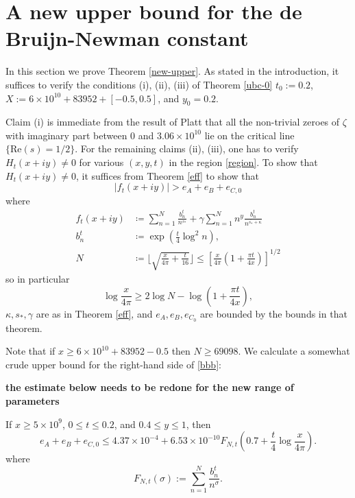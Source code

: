 \section{A new upper bound for the de Bruijn-Newman constant}

In this section we prove Theorem \ref{new-upper}.  As stated in the introduction, it suffices to verify the conditions (i), (ii), (iii) of Theorem \ref{ubc-0} $t_0 := 0.2$, $X := 6 \times 10^{10} + 83952 + [-0.5,0.5]$, and $y_0 = 0.2$.  

Claim (i) is immediate from the result of Platt \cite{platt} that all the non-trivial zeroes of $\zeta$ with imaginary part between $0$ and $3.06 \times 10^{10}$ lie on the critical line $\{ \mathrm{Re}(s) = 1/2\}$.  For the remaining claims (ii), (iii), one has to verify $H_t(x+iy) \neq 0$ for various $(x,y,t)$ in the region \eqref{region}.
To show that $H_t(x+iy) \neq 0$, it suffices from Theorem \ref{eff} to show that
\begin{equation}\label{bbb}
|f_t(x+iy)| > e_A + e_B + e_{C,0} 
\end{equation}
where
\begin{align*}
f_t(x+iy) &\coloneqq \sum_{n=1}^N \frac{b_n^t}{n^{s_*}} + \gamma \sum_{n=1}^N n^y \frac{b_n^t}{n^{\overline{s_*} + \kappa}}\\
b_n^t &\coloneqq \exp( \frac{t}{4} \log^2 n),\\
N &\coloneqq \lfloor \sqrt{\frac{x}{4\pi} + \frac{t}{16}} \rfloor \leq [\frac{x}{4\pi} (1 + \frac{\pi t}{4x})]^{1/2}
\end{align*}
so in particular
\begin{equation}\label{logx}
 \log \frac{x}{4\pi} \geq 2 \log N - \log(1 + \frac{\pi t}{4x}),
\end{equation}
$\kappa, s_*, \gamma$ are as in Theorem \ref{eff}, and $e_A, e_B, e_{C_0}$ are bounded by the bounds in that theorem.

Note that if $x \geq 6 \times 10^{10} + 83952 - 0.5$ then $N \geq 69098$.  We calculate a somewhat crude upper bound for the right-hand side of \eqref{bbb}:

{\bf the estimate below needs to be redone for the new range of parameters}

\begin{lemma}\label{lac}  If $x \geq 5 \times 10^9$, $0 \leq t \leq 0.2$, and $0.4 \leq y \leq 1$, then
$$ e_A + e_B + e_{C,0} \leq 4.37 \times 10^{-4} + 6.53 \times 10^{-10} F_{N,t}(0.7 + \frac{t}{4} \log \frac{x}{4\pi}).$$
where
\begin{equation}\label{fnt-def}
 F_{N,t}( \sigma ) := \sum_{n=1}^N \frac{b_n^t}{n^\sigma}.
\end{equation}
\end{lemma}

